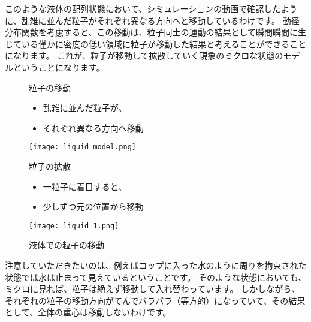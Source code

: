 \documentclass[uplatex,dvipdfmx,a4paper,11pt]{jsarticle}
\begin{document}
このような液体の配列状態において、シミュレーションの動画で確認したように、乱雑に並んだ粒子がそれぞれ異なる方向へと移動しているわけです。
動径分布関数を考慮すると、この移動は、粒子同士の運動の結果として瞬間瞬間に生じている僅かに密度の低い領域に粒子が移動した結果と考えることができることになります。
これが、粒子が移動して拡散していく現象のミクロな状態のモデルということになります。
\begin{figure}[htb]
	\begin{center}
		\large
			\begin{minipage}{0.45\textwidth}
				\begin{itembox}[l]{粒子の移動}
					\begin{itemize}
						\item 乱雑に並んだ粒子が、
						\item それぞれ異なる方向へ移動
					\end{itemize}
				\end{itembox}
				\vspace{3mm}
				\texttt{[image: liquid\_model.png]}
			\end{minipage}
			\begin{minipage}{0.45\textwidth}
				\begin{itembox}[l]{粒子の拡散}
					\begin{itemize}
						\item 一粒子に着目すると、
						\item 少しずつ元の位置から移動
					\end{itemize}
				\end{itembox}
				\vspace{3mm}
				\texttt{[image: liquid\_1.png]}
			\end{minipage}	
		\caption{液体での粒子の移動}
		\label{fig:ekitai_idou}
	\end{center}
\end{figure}

注意していただきたいのは、例えばコップに入った水のように周りを拘束された状態では水は止まって見えているということです。
そのような状態においても、ミクロに見れば、粒子は絶えず移動して入れ替わっています。
しかしながら、それぞれの粒子の移動方向がてんでバラバラ（等方的）になっていて、その結果として、全体の重心は移動しないわけです。
\end{document}
